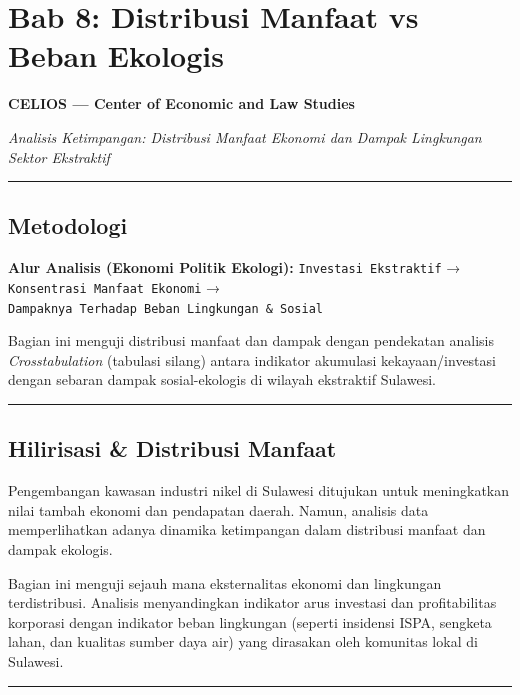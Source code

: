 \documentclass[
]{article}
\author{}
\date{}
\begin{document}
\section{Bab 8: Distribusi Manfaat vs Beban
Ekologis}\label{bab-8-distribusi-manfaat-vs-beban-ekologis}

\textbf{CELIOS --- Center of Economic and Law Studies}

\emph{Analisis Ketimpangan: Distribusi Manfaat Ekonomi dan Dampak
Lingkungan Sektor Ekstraktif}

\begin{center}\rule{0.5\linewidth}{0.5pt}\end{center}

\subsection{Metodologi}\label{metodologi}

\textbf{Alur Analisis (Ekonomi Politik Ekologi):}
\texttt{Investasi\ Ekstraktif} → \texttt{Konsentrasi\ Manfaat\ Ekonomi}
→ \texttt{Dampaknya\ Terhadap\ Beban\ Lingkungan\ \&\ Sosial}

Bagian ini menguji distribusi manfaat dan dampak dengan pendekatan
analisis \emph{Crosstabulation} (tabulasi silang) antara indikator
akumulasi kekayaan/investasi dengan sebaran dampak sosial-ekologis di
wilayah ekstraktif Sulawesi.

\begin{center}\rule{0.5\linewidth}{0.5pt}\end{center}

\subsection{Hilirisasi \& Distribusi
Manfaat}\label{hilirisasi-distribusi-manfaat}

Pengembangan kawasan industri nikel di Sulawesi ditujukan untuk
meningkatkan nilai tambah ekonomi dan pendapatan daerah. Namun, analisis
data memperlihatkan adanya dinamika ketimpangan dalam distribusi manfaat
dan dampak ekologis.

Bagian ini menguji sejauh mana eksternalitas ekonomi dan lingkungan
terdistribusi. Analisis menyandingkan indikator arus investasi dan
profitabilitas korporasi dengan indikator beban lingkungan (seperti
insidensi ISPA, sengketa lahan, dan kualitas sumber daya air) yang
dirasakan oleh komunitas lokal di Sulawesi.

\begin{center}\rule{0.5\linewidth}{0.5pt}\end{center}
\end{document}

